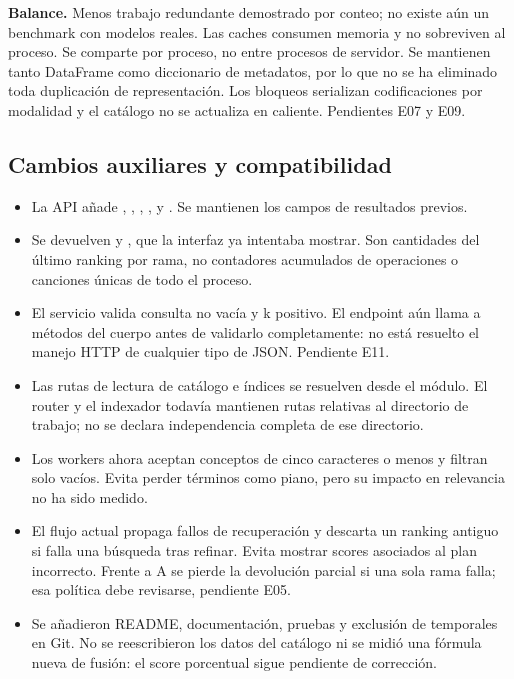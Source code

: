 \textbf{Balance.} Menos trabajo redundante demostrado por conteo; no existe aún
un benchmark con modelos reales. Las caches consumen memoria y no sobreviven
al proceso. Se comparte por proceso, no entre procesos de servidor. Se mantienen
tanto DataFrame como diccionario de metadatos, por lo que no se ha eliminado
toda duplicación de representación. Los bloqueos serializan codificaciones
por modalidad y el catálogo no se actualiza en caliente. Pendientes E07 y E09.

\subsection{Cambios auxiliares y compatibilidad}
\begin{itemize}
\item La API añade , ,
, ,  y
. Se mantienen los campos de resultados previos.
\item Se devuelven  y , que la interfaz ya intentaba
mostrar. Son cantidades del último ranking por rama, no contadores acumulados
de operaciones o canciones únicas de todo el proceso.
\item El servicio valida consulta no vacía y k positivo. El endpoint aún llama
a métodos del cuerpo antes de validarlo completamente: no está resuelto el
manejo HTTP de cualquier tipo de JSON. Pendiente E11.
\item Las rutas de lectura de catálogo e índices se resuelven desde el módulo.
El router y el indexador todavía mantienen rutas relativas al directorio de
trabajo; no se declara independencia completa de ese directorio.
\item Los workers ahora aceptan conceptos de cinco caracteres o menos y filtran
solo vacíos. Evita perder términos como piano, pero su impacto en relevancia no
ha sido medido.
\item El flujo actual propaga fallos de recuperación y descarta un ranking
antiguo si falla una búsqueda tras refinar. Evita mostrar scores asociados al
plan incorrecto. Frente a A se pierde la devolución parcial si una sola rama
falla; esa política debe revisarse, pendiente E05.
\item Se añadieron README, documentación, pruebas y exclusión de temporales en
Git. No se reescribieron los datos del catálogo ni se midió una fórmula nueva
de fusión: el score porcentual sigue pendiente de corrección.
\end{itemize}

